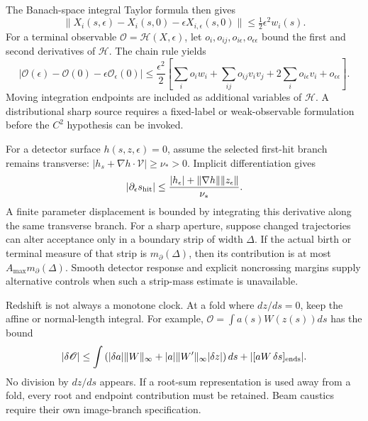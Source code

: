 The Banach-space integral Taylor formula then gives
\begin{equation}
 \|X_i(s,\epsilon)-X_i(s,0)-\epsilon X_{i,\epsilon}(s,0)\|
 \le \tfrac12\epsilon^2w_i(s).
 \label{v:finite_parameter_remainder}
\end{equation}
For a terminal observable $\mathscr O=\mathscr H(X,\epsilon)$, let $o_i,o_{ij},o_{i\epsilon},o_{\epsilon\epsilon}$ bound the first and second derivatives of $\mathscr H$. The chain rule yields
\begin{equation}
 |\mathscr O(\epsilon)-\mathscr O(0)-\epsilon\mathscr O_\epsilon(0)|
 \le\frac{\epsilon^2}{2}
 \left[\sum_i o_iw_i+\sum_{ij}o_{ij}v_iv_j+
 2\sum_io_{i\epsilon}v_i+o_{\epsilon\epsilon}\right].
 \label{v:observable_hessian}
\end{equation}
Moving integration endpoints are included as additional variables of $\mathscr H$. A distributional sharp source requires a fixed-label or weak-observable formulation before the $C^2$ hypothesis can be invoked.

For a detector surface $h(s,z,\epsilon)=0$, assume the selected first-hit branch remains transverse:
$|h_s+\nabla h\cdot\mathcal V|\ge\nu_*>0$.
Implicit differentiation gives
\begin{equation}
 |\partial_\epsilon s_{\rm hit}|
 \le\frac{|h_\epsilon|+\|\nabla h\|\|z_\epsilon\|}{\nu_*}.
 \label{v:hit_time}
\end{equation}
A finite parameter displacement is bounded by integrating this derivative along the same transverse branch. For a sharp aperture, suppose changed trajectories can alter acceptance only in a boundary strip of width $\Delta$. If the actual birth or terminal measure of that strip is $m_\partial(\Delta)$, then its contribution is at most $A_{\max}m_\partial(\Delta)$. Smooth detector response and explicit noncrossing margins supply alternative controls when such a strip-mass estimate is unavailable.

Redshift is not always a monotone clock. At a fold where $dz/ds=0$, keep the affine or normal-length integral. For example,
$\mathscr O=\int a(s)W(z(s))ds$ has the bound
\begin{equation}
 |\delta\mathscr O|\le\int
 \left(|\delta a|\|W\|_\infty+
 |a|\|W'\|_\infty|\delta z|\right)ds+
 |[aW\,\delta s]_{\rm ends}|.
 \label{v:redshift_fold}
\end{equation}
No division by $dz/ds$ appears. If a root-sum representation is used away from a fold, every root and endpoint contribution must be retained. Beam caustics require their own image-branch specification.

